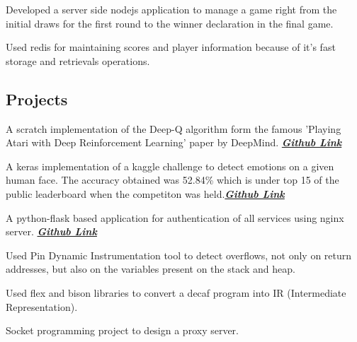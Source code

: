 \documentclass[letterpaper]{deedy-resume} %
\begin{document}
\begin{minipage}[t]{0.66\textwidth}


\begin{tightitemize}
\item Developed a server side nodejs application to manage a game right from the initial draws for the first round to the winner declaration in the final game.
\item Used redis for maintaining scores and player information because of it's fast storage and retrievals operations.
\end{tightitemize}

\sectionspace %

\vspace{\topsep} %
\subsection{Projects}
\vspace{\topsep} %
\begin{tightitemize}
\item {} A scratch implementation of the Deep-Q algorithm form the famous 'Playing Atari with Deep Reinforcement Learning' paper by DeepMind. {\footnotesize \textit{\textbf{\href{https://github.com/jayanthkaturi/deepRL_agent}{Github Link} }}}
\item {} A keras implementation of a kaggle challenge to detect emotions on a given human face. The accuracy obtained was 52.84\% which is under top 15 of the public leaderboard when the competiton was held.{\footnotesize \textit{\textbf{\href{https://github.com/jayanthkaturi/emotion_detection}{Github Link} }}}
\item {} A python-flask based application for authentication of all services using nginx server. {\footnotesize \textit{\textbf{\href{https://github.com/jayanthkaturi/nginx-auth-proxy}{Github Link}}}}
\item {} Used Pin Dynamic Instrumentation tool to detect overflows, not only on return addresses, but also on the variables present on the stack and heap.
\item {} Used flex and bison libraries to
convert a decaf program into IR (Intermediate Representation).
\item {} Socket programming project to design a proxy server.
\end{tightitemize}


\end{minipage}
\end{document}
